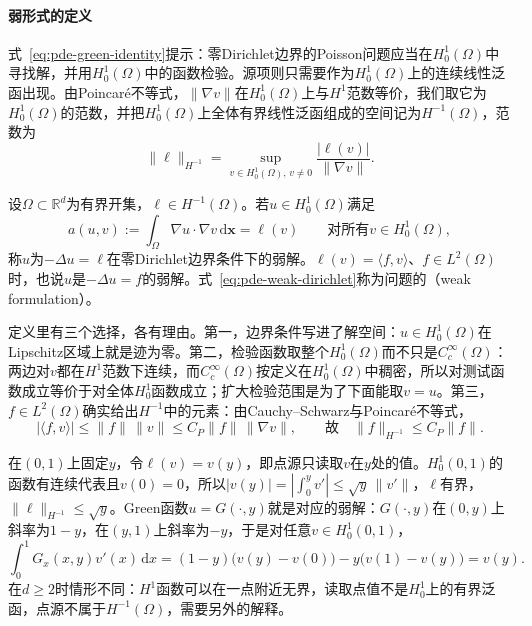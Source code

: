 \paragraph{弱形式的定义}
式~\eqref{eq:pde-green-identity}提示：零Dirichlet边界的Poisson问题应当在$H_0^1(\Omega)$中寻找解，并用$H_0^1(\Omega)$中的函数检验。源项则只需要作为$H_0^1(\Omega)$上的连续线性泛函出现。由Poincaré不等式，$\|\nabla v\|$在$H_0^1(\Omega)$上与$H^1$范数等价，我们取它为$H_0^1(\Omega)$的范数，并把$H_0^1(\Omega)$上全体有界线性泛函组成的空间记为$H^{-1}(\Omega)$，范数为
\[
  \|\ell\|_{H^{-1}}=\sup_{v\in H_0^1(\Omega),\,v\neq0}\frac{|\ell(v)|}{\|\nabla v\|} .
\]

\begin{definition}[零Dirichlet边界Poisson问题的弱解]
\label{def:pde-weak-dirichlet}
设$\Omega\subset\mathbb R^d$为有界开集，$\ell\in H^{-1}(\Omega)$。若$u\in H_0^1(\Omega)$满足
\begin{equation}
  a(u,v):=\int_\Omega\nabla u\cdot\nabla v\,\mathrm d\bm x=\ell(v)\qquad\text{对所有}v\in H_0^1(\Omega),
  \label{eq:pde-weak-dirichlet}
\end{equation}
称$u$为$-\Delta u=\ell$在零Dirichlet边界条件下的弱解。$\ell(v)=\langle f,v\rangle$、$f\in L^2(\Omega)$时，也说$u$是$-\Delta u=f$的弱解。式~\eqref{eq:pde-weak-dirichlet}称为问题的（weak formulation）。
\end{definition}

定义里有三个选择，各有理由。第一，边界条件写进了解空间：$u\in H_0^1(\Omega)$在Lipschitz区域上就是迹为零。第二，检验函数取整个$H_0^1(\Omega)$而不只是$C_c^\infty(\Omega)$：两边对$v$都在$H^1$范数下连续，而$C_c^\infty(\Omega)$按定义在$H_0^1(\Omega)$中稠密，所以对测试函数成立等价于对全体$H_0^1$函数成立；扩大检验范围是为了下面能取$v=u$。第三，$f\in L^2(\Omega)$确实给出$H^{-1}$中的元素：由Cauchy--Schwarz与Poincaré不等式，
\[
  |\langle f,v\rangle|\leq\|f\|\,\|v\|\leq C_P\|f\|\,\|\nabla v\|,\qquad\text{故}\quad\|f\|_{H^{-1}}\leq C_P\|f\| .
\]

\begin{example}
\label{ex:pde-point-source}
在$(0,1)$上固定$y$，令$\ell(v)=v(y)$，即点源只读取$v$在$y$处的值。$H_0^1(0,1)$的函数有连续代表且$v(0)=0$，所以$|v(y)|=|\int_0^yv'|\leq\sqrt y\,\|v'\|$，$\ell$有界，$\|\ell\|_{H^{-1}}\leq\sqrt y$。Green函数$u=G(\cdot,y)$就是对应的弱解：$G(\cdot,y)$在$(0,y)$上斜率为$1-y$，在$(y,1)$上斜率为$-y$，于是对任意$v\in H_0^1(0,1)$，
\[
  \int_0^1G_x(x,y)v'(x)\,\mathrm dx=(1-y)\bigl(v(y)-v(0)\bigr)-y\bigl(v(1)-v(y)\bigr)=v(y) .
\]
在$d\geq2$时情形不同：$H^1$函数可以在一点附近无界，读取点值不是$H_0^1$上的有界泛函，点源不属于$H^{-1}(\Omega)$，需要另外的解释。
\end{example}


